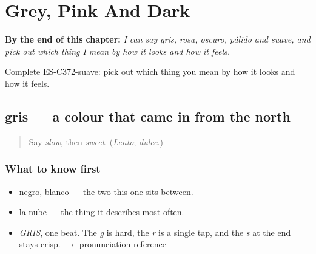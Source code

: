 
\chapter{Grey, Pink And Dark}
\label{ch:gris-y-rosa}

\begin{chapteropening}
\textbf{By the end of this chapter:} \emph{I can say gris, rosa, oscuro, pálido and suave, and pick out which thing I mean by how it looks and how it feels.}

Complete ES-C372-suave: pick out which thing you mean by how it looks and how it feels.
\end{chapteropening}

\section[gris]{gris — a colour that came in from the north}

\label{lesson:ES-C372-gris}



\begin{quote}
Say \emph{slow}, then \emph{sweet}. (\emph{Lento}; \emph{dulce}.)
\end{quote}

\subsection*{What to know first}
\begin{itemize}
\raggedright
  \item negro, blanco — the two this one sits between.
  \item la nube — the thing it describes most often.
\end{itemize}

\begin{sounds}
\begin{itemize}
\raggedright
  \item \emph{GRIS}, one beat. The \emph{g} is hard, the \emph{r} is a single tap, and the \emph{s} at the end stays crisp. $\to$ pronunciation reference
\end{itemize}
\end{sounds}

